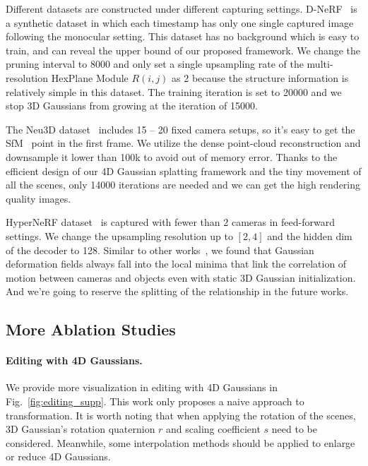 \documentclass[10pt,twocolumn,letterpaper]{article}
\begin{document}
Different datasets are constructed under different capturing settings. D-NeRF~\cite{pumarola2021dnerf} is a synthetic dataset in which each timestamp has only one single captured image following the monocular setting. This dataset has no background which is easy to train, and can reveal the upper bound of our proposed framework. We change the pruning interval to 8000 and only set a single upsampling rate of the multi-resolution HexPlane Module $R(i,j)$ as 2 because the structure information is relatively simple in this dataset. The training iteration is set to 20000 and we stop 3D Gaussians from growing at the iteration of 15000.

The Neu3D dataset~\cite{li2022neural} includes 15 -- 20 fixed camera setups, so it's easy to get the SfM~\cite{schonberger2016structurefrommotion} point in the first frame. We utilize the dense point-cloud reconstruction and downsample it lower than 100k to avoid out of memory error. Thanks to the efficient design of our 4D Gaussian splatting framework and the tiny movement of all the scenes, only 14000 iterations are needed and we can get the high rendering quality images. 

HyperNeRF dataset~\cite{park2021hypernerf} is captured with fewer than 2 cameras in feed-forward settings. We change the upsampling resolution up to $[2,4]$ and the hidden dim of the decoder to 128. Similar to other works~\cite{tineuvox,park2021hypernerf}, we found that Gaussian deformation fields always fall into the local minima that link the correlation of motion between cameras and objects even with static 3D Gaussian initialization. And we're going to reserve the splitting of the relationship in the future works. 

\subsection{More Ablation Studies}
\label{Supsec:ablationstudies}

\paragraph{Editing with 4D Gaussians.}
We provide more visualization in editing with 4D Gaussians in Fig.~\ref{fig:editing_supp}.  This work only proposes a naive approach to transformation. It is worth noting that when applying the rotation of the scenes, 3D Gaussian's rotation quaternion $r$ and scaling coefficient $s$ need to be considered. Meanwhile, some interpolation methods should be applied to enlarge or reduce 4D Gaussians.
\end{document}
